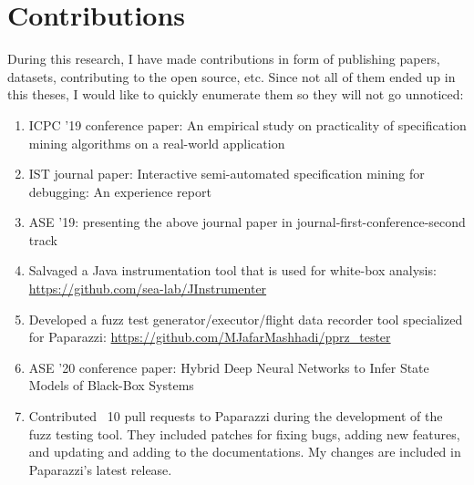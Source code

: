 \dedication{To the ones who made this a smoother journey.} 


\tableofcontents


\listoftables


\listoffigures


\chapter{Contributions}
During this research, I have made contributions in form of publishing papers, datasets, contributing to the open source, etc. 
Since not all of them ended up in this theses, I would like to quickly enumerate them so they will not go unnoticed:
\begin{enumerate}
    \item ICPC '19 conference paper: An empirical study on practicality of specification mining algorithms on a real-world application
    \item IST journal paper: Interactive semi-automated specification mining for debugging: An experience report
    \item ASE '19: presenting the above journal paper in journal-first-conference-second track
    \item Salvaged a Java instrumentation tool that is used for white-box analysis: \url{https://github.com/sea-lab/JInstrumenter}
    \item Developed a fuzz test generator/executor/flight data recorder tool specialized for Paparazzi: \url{https://github.com/MJafarMashhadi/pprz_tester}
    \item ASE '20 conference paper: Hybrid Deep Neural Networks to Infer State Models of Black-Box Systems
    \item Contributed ~10 pull requests to Paparazzi during the development of the fuzz testing tool. They included patches for fixing bugs, adding new features, and updating and adding to the documentations. My changes are included in Paparazzi's latest release.
\end{enumerate}
